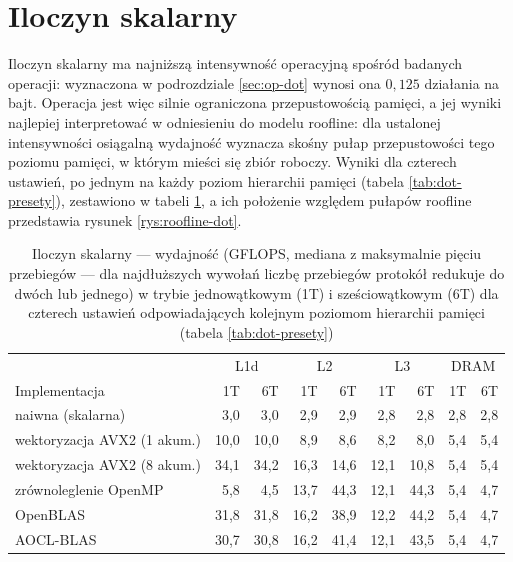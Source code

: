\documentclass[a4paper,12pt]{book} %
\begin{document}
\section{Iloczyn skalarny}
\label{sec:wyniki-dot}

Iloczyn skalarny ma najniższą intensywność operacyjną spośród badanych operacji: wyznaczona w podrozdziale \ref{sec:op-dot} wynosi ona $0,125$ działania na bajt. Operacja jest więc silnie ograniczona przepustowością pamięci, a jej wyniki najlepiej interpretować w odniesieniu do modelu roofline: dla ustalonej intensywności osiągalną wydajność wyznacza skośny pułap przepustowości tego poziomu pamięci, w którym mieści się zbiór roboczy. Wyniki dla czterech ustawień, po jednym na każdy poziom hierarchii pamięci (tabela \ref{tab:dot-presety}), zestawiono w tabeli \ref{tab:wyniki-dot}, a ich położenie względem pułapów roofline przedstawia rysunek \ref{rys:roofline-dot}.

\begin{table}[t!]
\centering
\caption{Iloczyn skalarny --- wydajność (GFLOPS, mediana z maksymalnie pięciu przebiegów --- dla najdłuższych wywołań liczbę przebiegów protokół redukuje do dwóch lub jednego) w trybie jednowątkowym (1T) i sześciowątkowym (6T) dla czterech ustawień odpowiadających kolejnym poziomom hierarchii pamięci (tabela \ref{tab:dot-presety})}
\label{tab:wyniki-dot}
\small
\begin{tabular}{l rr rr rr rr}
\hline
 & \multicolumn{2}{c}{L1d} & \multicolumn{2}{c}{L2} & \multicolumn{2}{c}{L3} & \multicolumn{2}{c}{DRAM} \\
Implementacja & 1T & 6T & 1T & 6T & 1T & 6T & 1T & 6T \\
\hline
naiwna (skalarna)           &  3,0 &  3,0 &  2,9 &  2,9 &  2,8 &  2,8 & 2,8 & 2,8 \\
wektoryzacja AVX2 (1 akum.) & 10,0 & 10,0 &  8,9 &  8,6 &  8,2 &  8,0 & 5,4 & 5,4 \\
wektoryzacja AVX2 (8 akum.) & 34,1 & 34,2 & 16,3 & 14,6 & 12,1 & 10,8 & 5,4 & 5,4 \\
zrównoleglenie OpenMP       &  5,8 &  4,5 & 13,7 & 44,3 & 12,1 & 44,3 & 5,4 & 4,7 \\
OpenBLAS                    & 31,8 & 31,8 & 16,2 & 38,9 & 12,2 & 44,2 & 5,4 & 4,7 \\
AOCL-BLAS                   & 30,7 & 30,8 & 16,2 & 41,4 & 12,1 & 43,5 & 5,4 & 4,7 \\
\hline
\end{tabular}
\end{table}
\end{document}
